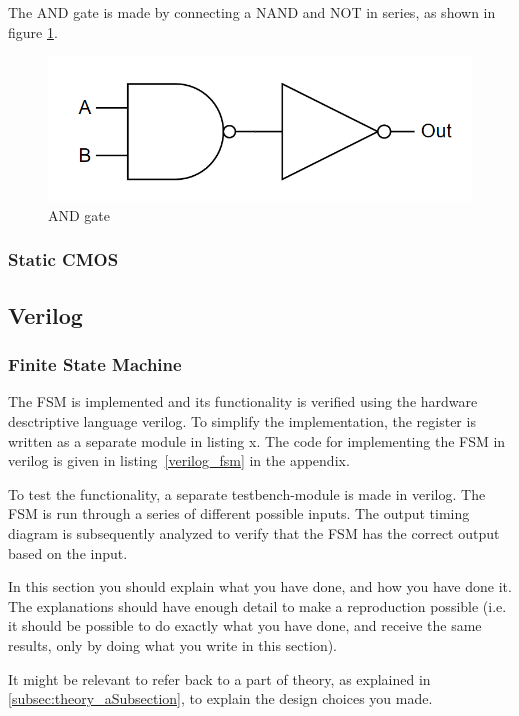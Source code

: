 The AND gate is made by connecting a NAND and NOT in series, as shown in figure \ref{fig:AND}.
\begin{figure}[H]
    \centering
    \includegraphics[width=0.4\linewidth]{Figures/And gate.png}
    \caption{AND gate}
    \label{fig:AND}
\end{figure}

\subsubsection{Static CMOS}

\subsection{Verilog}


\subsubsection{Finite State Machine}
\label{subsec:fsm_verilog}

The FSM is implemented and its functionality is verified using the hardware desctriptive language verilog. To simplify the implementation, the register is written as a separate module in listing x. The code for implementing the FSM in verilog is given in listing~\ref{verilog_fsm} in the appendix.

To test the functionality, a separate testbench-module is made in verilog. The FSM is run through a series of different possible inputs. The output timing diagram is subsequently analyzed to verify that the FSM has the correct output based on the input.




In this section you should explain what you have done, and how you have done it. The explanations should have enough detail to make a reproduction possible (i.e. it should be possible to do exactly what you have done, and receive the same results, only by doing what you write in this section).


It might be relevant to refer back to a part of theory, as explained in \autoref{subsec:theory_aSubsection}, to explain the design choices you made.

